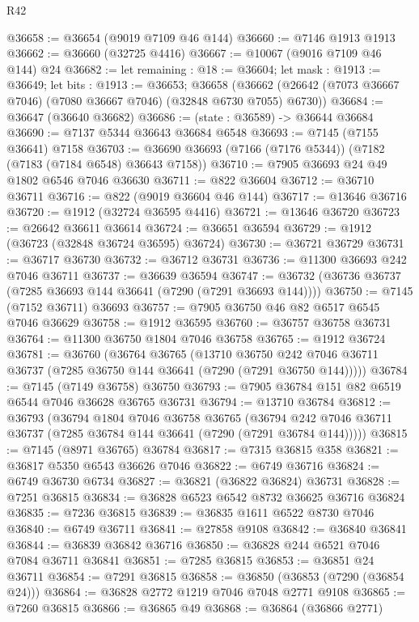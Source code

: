 \begin{lexlean}{R42}
\begin{coremodule}
{@36658 := @36654 (@9019 @7109 @46 @144)
@36660 := @7146 @1913 @1913
@36662 := @36660 (@32725 @4416)
@36667 := @10067 (@9016 @7109 @46 @144) @24
@36682 := let remaining : @18 := @36604;
  let mask : @1913 := @36649;
  let bits : @1913 := @36653;
  @36658 (@36662 (@26642 (@7073 @36667 @7046) (@7080 @36667 @7046) (@32848 @6730 @7055) @6730))
@36684 := @36647 (@36640 @36682)
@36686 := (state : @36589) -> @36644 @36684
@36690 := @7137 @5344 @36643 @36684 @6548
@36693 := @7145 (@7155 @36641) @7158
@36703 := @36690 @36693 (@7166 (@7176 @5344)) (@7182 (@7183 (@7184 @6548) @36643 @7158))
@36710 := @7905 @36693 @24 @49 @1802 @6546 @7046 @36630
@36711 := @822 @36604
@36712 := @36710 @36711
@36716 := @822 (@9019 @36604 @46 @144)
@36717 := @13646 @36716
@36720 := @1912 (@32724 @36595 @4416)
@36721 := @13646 @36720
@36723 := @26642 @36611 @36614
@36724 := @36651 @36594
@36729 := @1912 (@36723 (@32848 @36724 @36595) @36724)
@36730 := @36721 @36729
@36731 := @36717 @36730
@36732 := @36712 @36731
@36736 := @11300 @36693 @242 @7046 @36711
@36737 := @36639 @36594
@36747 := @36732 (@36736 @36737 (@7285 @36693 @144 @36641 (@7290 (@7291 @36693 @144))))
@36750 := @7145 (@7152 @36711) @36693
@36757 := @7905 @36750 @46 @82 @6517 @6545 @7046 @36629
@36758 := @1912 @36595
@36760 := @36757 @36758 @36731
@36764 := @11300 @36750 @1804 @7046 @36758
@36765 := @1912 @36724
@36781 := @36760
    (@36764
      @36765
      (@13710
        @36750
        @242
        @7046
        @36711
        @36737
        (@7285 @36750 @144 @36641 (@7290 (@7291 @36750 @144)))))
@36784 := @7145 (@7149 @36758) @36750
@36793 := @7905 @36784 @151 @82 @6519 @6544 @7046 @36628 @36765 @36731
@36794 := @13710 @36784
@36812 := @36793
    (@36794
      @1804
      @7046
      @36758
      @36765
      (@36794 @242 @7046 @36711 @36737 (@7285 @36784 @144 @36641 (@7290 (@7291 @36784 @144)))))
@36815 := @7145 (@8971 @36765) @36784
@36817 := @7315 @36815 @358
@36821 := @36817 @5350 @6543 @36626 @7046
@36822 := @6749 @36716
@36824 := @6749 @36730 @6734
@36827 := @36821 (@36822 @36824) @36731
@36828 := @7251 @36815
@36834 := @36828 @6523 @6542 @8732 @36625 @36716 @36824
@36835 := @7236 @36815
@36839 := @36835 @1611 @6522 @8730 @7046
@36840 := @6749 @36711
@36841 := @27858 @9108
@36842 := @36840 @36841
@36844 := @36839 @36842 @36716
@36850 := @36828 @244 @6521 @7046 @7084 @36711 @36841
@36851 := @7285 @36815
@36853 := @36851 @24 @36711
@36854 := @7291 @36815
@36858 := @36850 (@36853 (@7290 (@36854 @24)))
@36864 := @36828 @2772 @1219 @7046 @7048 @2771 @9108
@36865 := @7260 @36815
@36866 := @36865 @49
@36868 := @36864 (@36866 @2771)
}
\end{coremodule}
\end{lexlean}
